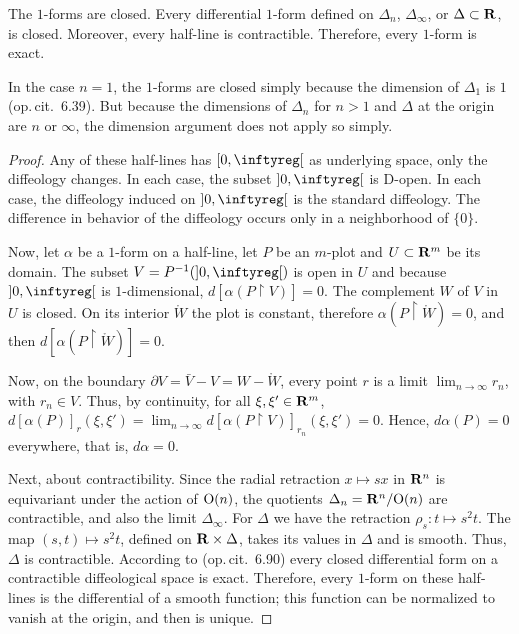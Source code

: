 
\begin{Article}{The $1$-forms are closed.}{}
  Every differential $1$-form defined on $\Delta_n$,
  $\Delta_\infty$,
  or $\Delta \subset \mathbf{R}$,
  is closed.
  Moreover,
  every half-line is contractible.
  Therefore,
  every $1$-form is exact.
  
  \Note In the case $n=1$,
  the $1$-forms are closed simply because the dimension of $\Delta_1$ is $1$ (op.\,cit. \textsection\,6.39).
  But because the dimensions of $\Delta_n$ for $n>1$ and $\Delta$ at the origin are $n$ or $\infty$,
  the dimension argument does not apply so simply.
\end{Article}

\begin{proof}
  Any of these half-lines has $\LeftClosedInterval{0,\infty}$ as underlying space,
  only the diffeology changes.
  In each case,
  the subset $\OpenInterval{0,\infty}$ is D-open.
  In each case,
  the diffeology induced on $\OpenInterval{0,\infty}$ is the standard diffeology.
  The difference in behavior of the diffeology occurs only in a neighborhood of $\{0\}$.
  
  Now,
  let $\alpha$ be a $1$-form on a half-line,
  let $P$ be an $m$-plot and $U \subset \mathbf{R}^m$ be its domain.
  The subset $V = P^{-1}(\OpenInterval{0,\infty})$ is open in $U$ and because $\OpenInterval{0,\infty}$ is $1$-dimensional, $d[\alpha(P\restriction V)]=0$.
  The complement $W$ of $V$ in $U$ is closed. On its interior $\mathring{W}$ the plot is constant,
  therefore $\alpha(P\restriction \mathring{W})= 0$,
  and then $d[\alpha(P\restriction \mathring{W})]= 0$.
  
  Now,
  on the boundary $\partial V = \bar V - V = W - \mathring{W}$,
  every point $r$ is a limit $\lim_{n\to\infty} r_n$, with $r_n \in V$.
  Thus,
  by continuity,
  for all $\xi, \xi' \in \mathbf{R}^m$,
  $d[\alpha(P)]_r(\xi, \xi') = \lim_{n\to\infty} d[\alpha(P\restriction V)]_{r_n}(\xi, \xi') = 0$.
  Hence,
  $d\alpha(P) = 0$ everywhere,
  that is,
  $d\alpha=0$.
  
  Next,
  about contractibility.
  Since the radial retraction $x \mapsto sx$ in $\mathbf{R}^n$ is equivariant under the action of $\mathrm{O}(n)$,
  the quotients $\Delta_n=\mathbf{R}^n/\mathrm{O}(n)$ are contractible,
  and also the limit $\Delta_\infty$.
  For $\Delta$ we have the retraction $\rho_s : t \mapsto s^2t$.
  The map $(s,t) \mapsto s^2t$, defined on $\mathbf{R}\times\Delta$, takes its values in $\Delta$ and is smooth.
  Thus,
  $\Delta$ is contractible.
  According to (op.\,cit. \textsection\,6.90) every closed differential form on a contractible diffeological space is exact.
  Therefore,
  every $1$-form on these half-lines is the differential of a smooth function;
  this function can be normalized to vanish at the origin,
  and then is unique.
\end{proof}

